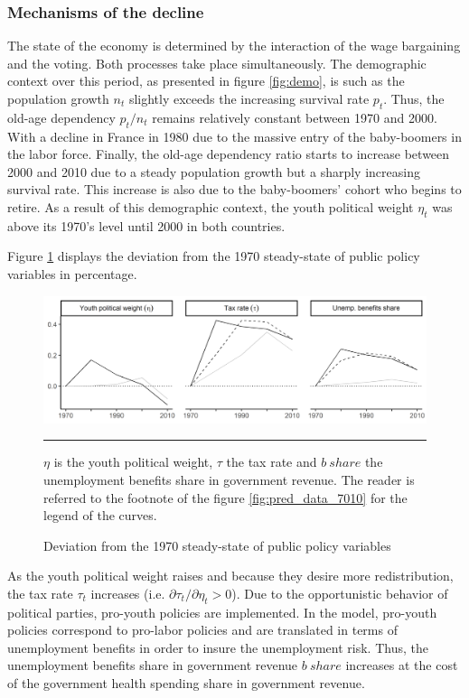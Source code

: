 \subsubsection{Mechanisms of the decline}

The state of the economy is determined by the interaction of the wage bargaining and the voting. Both processes take place simultaneously. The demographic context over this period, as presented in figure \ref{fig:demo}, is such as the population growth $n_t$ slightly exceeds the increasing survival rate $p_t$. Thus, the old-age dependency $p_t/n_t$ remains relatively constant between 1970 and 2000. With a decline in France in 1980 due to the massive entry of the baby-boomers in the labor force. Finally, the old-age dependency ratio starts to increase between 2000 and 2010 due to a steady population growth but a sharply increasing survival rate. This increase is also due to the baby-boomers' cohort who begins to retire. As a result of this demographic context, the youth political weight $\eta_t$ was above its 1970's level until 2000 in both countries.

Figure \ref{fig:dev_public_7010} displays the deviation from the 1970 steady-state of public policy variables in percentage.
\begin{figure}[tb]
	\centering
	\includegraphics[width=1\linewidth]{../result/deviation/dev_public7010.png}
	\caption{Deviation from the 1970 steady-state of public policy variables}
	\label{fig:dev_public_7010}
	\vspace{.5ex}
	\hrule
	\vspace{-4ex}
 	\justify\singlespacing\footnotesize $\eta$ is the youth political weight, $\tau$ the tax rate and $b~share$ the unemployment benefits share in government revenue. The reader is referred to the footnote of the figure \ref{fig:pred_data_7010} for the legend of the curves.
\end{figure}
As the youth political weight raises and because they desire more redistribution, the tax rate $\tau_t$ increases (i.e. $\partial \tau_t / \partial \eta_t > 0$). Due to the opportunistic behavior of political parties, pro-youth policies are implemented. In the model, pro-youth policies correspond to pro-labor policies and are translated in terms of unemployment benefits in order to insure the unemployment risk. Thus, the unemployment benefits share in government revenue $b~share$ increases at the cost of the government health spending share in government revenue.

